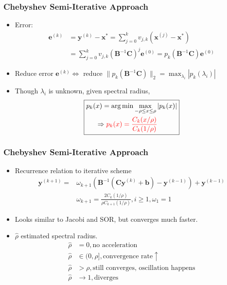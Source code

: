 \documentclass[serif,mathserif]{beamer}
\newcommand{\BOLD}[1]{\mathbf{#1}}
\newcommand{\TODO}[1]{\textcolor{red}{#1}}
\newcommand{\argmin}{\operatornamewithlimits{arg\min}}
\begin{document}
\begin{frame}
 \frametitle{Chebyshev Semi-Iterative Approach}
 \begin{itemize}
  \item Error:
  \begin{equation*}
  \begin{split}
   \BOLD{e}^{(k)} &= \BOLD{y}^{(k)}-\BOLD{x}^*=\sum_{j=0}^k v_{j, k}(\BOLD{x}^{(j)}-\BOLD{x}^*) \\
   &= \sum_{j=0}^kv_{j, k}(\BOLD{B}^{-1}\BOLD{C})^j\BOLD{e}^{(0)} = p_k(\BOLD{B}^{-1}\BOLD{C})\BOLD{e}^{(0)}
  \end{split}
  \end{equation*}
  \item Reduce error $\BOLD{e}^{(k)} \Leftrightarrow$ reduce $\|p_k(\BOLD{B}^{-1}\BOLD{C})\|_2 = \max_{\lambda_i}|p_k(\lambda_i)|$
  \item Though $\lambda_i$ is unknown, given spectral radius,
  \begin{equation*}
  \boxed {
  \begin{split}
   p_k(&x) = \argmin { \max_{-\rho \le x \le \rho}|p_k(x)|} \\
    &\Rightarrow \TODO{p_k(x) = \frac{C_k(x/\rho)}{C_k(1/\rho)}}
  \end{split}
  }
  \end{equation*}
 \end{itemize}
\end{frame}

\begin{frame}
 \frametitle{Chebyshev Semi-Iterative Approach}
 \begin{itemize}
  \item Recurrence relation to iterative scheme
  \begin{equation*}
   \begin{split}
    \BOLD{y}^{(k+1)} = &\omega_{k+1}(\BOLD{B}^{-1}(\BOLD{Cy}^{(k)}+\BOLD{b})-\BOLD{y}^{(k-1)})+\BOLD{y}^{(k-1)} \\
    &\omega_{k+1} = \frac{2C_k(1/\rho)}{\rho C_{k+1}(1/\rho)}, i \ge 1, \omega_1 = 1
   \end{split}
  \end{equation*}
  \pause
  \item Looks similar to Jacobi and SOR, but converges much faster.
  \pause
  \item $\hat \rho$ estimated spectral radius.
  \begin{equation*}
   \begin{split}
    \hat \rho &= 0, \text{no acceleration} \\
    \hat \rho &\in (0, \rho], \text{convergence rate} \uparrow \\
    \hat \rho &> \rho, \text{still converges, oscillation happens} \\
    \hat \rho &\rightarrow 1, \text{diverges}
   \end{split}
  \end{equation*}
 \end{itemize}
\end{frame}
\end{document}
